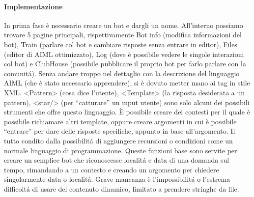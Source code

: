 \documentclass[]{article}
\begin{document}
\paragraph{Implementazione}
In prima fase è necessario creare un bot e dargli un nome. All’interno possiamo trovare 5 pagine principali, rispettivamente Bot info (modifica informazioni del bot), Train (parlare col bot e cambiare risposte senza entrare in editor), Files (editor di AIML ottimizzato), Log (dove è possibile vedere le singole interazioni col bot) e ClubHouse (possibile pubblicare il proprio bot per farlo parlare con la comunitá). 
Senza andare troppo nel dettaglio con la descrizione del linguaggio AIML (che è stato necessario apprendere), si è dovuto metter mano ai tag in stile XML. <Pattern> (cosa dice l’utente), <Template> (la risposta desiderata a un pattern), <star/> (per “catturare” un input utente) sono solo alcuni dei possibili strumenti che offre questo linguaggio. È possibile creare dei contesti per il quale è possibile richiamare altri template, oppure creare argomenti in cui è possibile “entrare” per dare delle risposte specifiche, appunto in base all’argomento. Il tutto condito dalla possibilitá di aggiungere recursioni o condizioni come un normale linguaggio di programmazione. Queste funzioni base sono servite per creare un semplice bot che riconoscesse localitá e data di una domanda sul tempo, rimandando a un contesto e creando un argomento per chiedere singolarmente data o localitá. Grave mancanza è l’impossibilitá o l’estrema difficoltá di usare del contenuto dinamico, limitato a prendere stringhe da file. 
\end{document}
